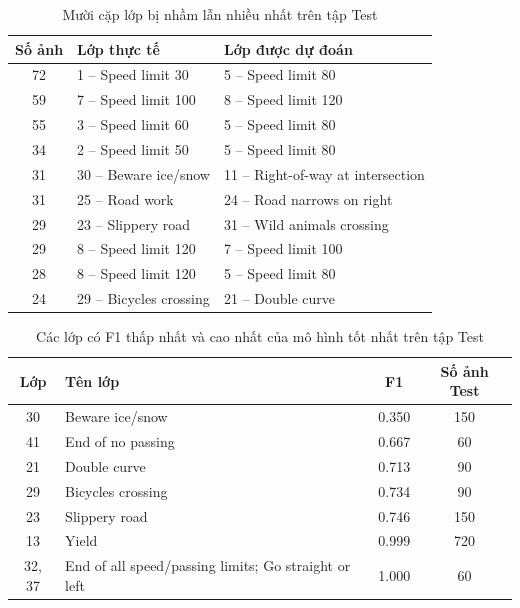 \begin{table}[H]
\centering
\caption{Mười cặp lớp bị nhầm lẫn nhiều nhất trên tập Test}
\label{tab:cap-nham-lan}
\begin{tabular}{|c|p{5.4cm}|p{6.6cm}|}
\hline
\textbf{Số ảnh} & \textbf{Lớp thực tế} & \textbf{Lớp được dự đoán} \\
\hline
72 & 1 -- Speed limit 30 & 5 -- Speed limit 80 \\
\hline
59 & 7 -- Speed limit 100 & 8 -- Speed limit 120 \\
\hline
55 & 3 -- Speed limit 60 & 5 -- Speed limit 80 \\
\hline
34 & 2 -- Speed limit 50 & 5 -- Speed limit 80 \\
\hline
31 & 30 -- Beware ice/snow & 11 -- Right-of-way at intersection \\
\hline
31 & 25 -- Road work & 24 -- Road narrows on right \\
\hline
29 & 23 -- Slippery road & 31 -- Wild animals crossing \\
\hline
29 & 8 -- Speed limit 120 & 7 -- Speed limit 100 \\
\hline
28 & 8 -- Speed limit 120 & 5 -- Speed limit 80 \\
\hline
24 & 29 -- Bicycles crossing & 21 -- Double curve \\
\hline
\end{tabular}
\end{table}

\begin{table}[H]
\centering
\caption{Các lớp có F1 thấp nhất và cao nhất của mô hình tốt nhất trên tập Test}
\label{tab:f1-theo-lop}
\begin{tabular}{|c|p{7.6cm}|c|c|}
\hline
\textbf{Lớp} & \textbf{Tên lớp} & \textbf{F1} & \textbf{Số ảnh Test} \\
\hline
30 & Beware ice/snow & 0.350 & 150 \\
\hline
41 & End of no passing & 0.667 & 60 \\
\hline
21 & Double curve & 0.713 & 90 \\
\hline
29 & Bicycles crossing & 0.734 & 90 \\
\hline
23 & Slippery road & 0.746 & 150 \\
\hline
13 & Yield & 0.999 & 720 \\
\hline
32, 37 & End of all speed/passing limits; Go straight or left & 1.000 & 60 \\
\hline
\end{tabular}
\end{table}

